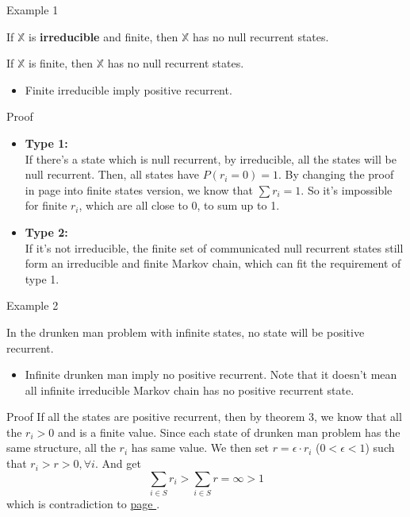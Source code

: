 \documentclass[mathserif]{beamer}
\begin{document}
\begin{frame}{Example 1}\label{finite_pos_rec}
	\begin{example}[type 1]
	If $\mathbb{X}$ is \textbf{irreducible} and finite, then $\mathbb{X}$ has no null recurrent states.
	\end{example}
	\begin{example}[type 2]
	If $\mathbb{X}$ is finite, then $\mathbb{X}$ has no null recurrent states.
	\end{example}
	\begin{itemize}
	\item Finite irreducible imply positive recurrent.
	\end{itemize}
\end{frame}

\begin{frame}{Proof}
	\begin{itemize}
	\item \textbf{Type 1:}\\
		If there's a state which is null recurrent, by irreducible, all the states will be null recurrent.
		Then, all states have $P(r_i = 0) = 1$.
		By changing the proof in page \pageref{proportion_sum} into finite states version, 
		we know that $\sum r_i = 1$.
		So it's impossible for finite $r_i$, which are all close to 0, to sum up to 1.
	\item \textbf{Type 2:}\\
		If it's not irreducible, the finite set of communicated null recurrent states still form an irreducible and finite Markov chain, which can fit the requirement of type 1.
	\end{itemize}
\end{frame}

\begin{frame}{Example 2}
	\begin{example}
	In the drunken man problem with infinite states, no state will be positive recurrent.
	\end{example}
	\begin{itemize}
	\item Infinite drunken man imply no positive recurrent.
		Note that it doesn't mean all infinite irreducible Markov chain has no positive recurrent state.
	\end{itemize}
\end{frame}

\begin{frame}{Proof}
	If all the states are positive recurrent, then by theorem 3, 
	we know that all the $r_i > 0$ and is a finite value.
	Since each state of drunken man problem has the same structure, all the $r_i$ has same value.
	We then set $r = \epsilon\cdot r_i$ ($0 < \epsilon < 1$) such that 
	$r_i > r > 0, \forall i$.
	And get
	\[
	\sum_{i\in S} r_i > \sum_{i\in S} r = \infty > 1
	\]
	which is contradiction to \hyperlink{proportion_sum}{page \pageref{proportion_sum}}.
\end{frame}
\end{document}
